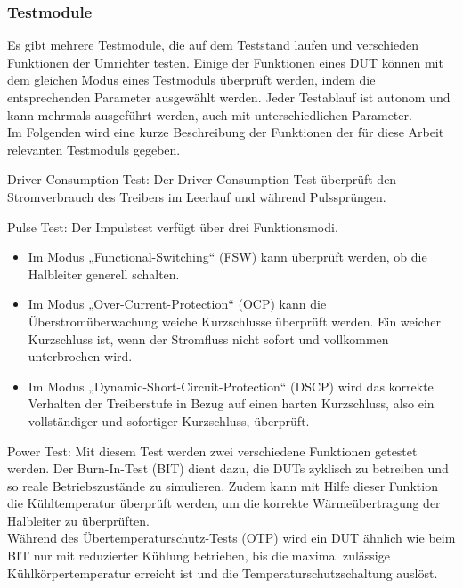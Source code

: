 \subsubsection{Testmodule}
Es gibt mehrere Testmodule, die auf dem Teststand laufen und verschieden Funktionen der Umrichter testen.
Einige der Funktionen eines DUT können mit dem gleichen Modus eines Testmoduls überprüft werden, indem die
entsprechenden Parameter ausgewählt werden.
Jeder Testablauf ist autonom und kann mehrmals ausgeführt werden, auch mit unterschiedlichen Parameter.
\\
Im Folgenden wird eine kurze Beschreibung der Funktionen der für diese Arbeit relevanten Testmoduls gegeben.

Driver Consumption Test:
Der Driver Consumption Test überprüft den Stromverbrauch des Treibers im Leerlauf und während Pulssprüngen.

Pulse Test:
Der Impulstest verfügt über drei Funktionsmodi.
\begin{itemize}
    \item Im Modus „Functional-Switching“ (FSW) kann überprüft werden, ob die Halbleiter generell schalten.
    \item Im Modus „Over-Current-Protection“ (OCP) kann die Überstromüberwachung weiche Kurzschlusse überprüft werden.
    Ein weicher Kurzschluss ist, wenn der Stromfluss nicht sofort und vollkommen unterbrochen wird.
    \item Im Modus „Dynamic-Short-Circuit-Protection“ (DSCP) wird das korrekte Verhalten der Treiberstufe in Bezug auf
    einen harten Kurzschluss, also ein vollständiger und sofortiger Kurzschluss, überprüft.
\end{itemize}

Power Test:
Mit diesem Test werden zwei verschiedene Funktionen getestet werden.
Der Burn-In-Test (BIT) dient dazu, die \ac{DUTs} zyklisch zu betreiben und so reale Betriebszustände zu simulieren.
Zudem kann mit Hilfe dieser Funktion die Kühltemperatur überprüft werden, um die korrekte Wärmeübertragung der Halbleiter zu überprüften.
\\
Während des Übertemperaturschutz-Tests (OTP) wird ein DUT ähnlich wie beim BIT nur mit reduzierter Kühlung betrieben, bis die maximal zulässige
Kühlkörpertemperatur erreicht ist und die Temperaturschutzschaltung auslöst.\cite*{Main_Manuel_USTB2018}
\color{red}     %
